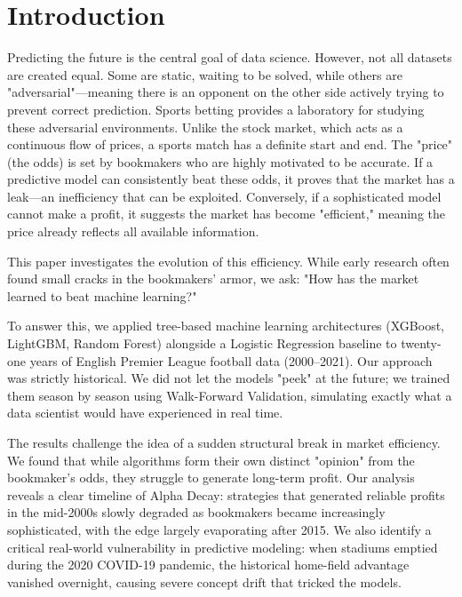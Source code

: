 \documentclass[pdflatex,sn-basic]{sn-jnl}
\begin{document}

\maketitle
\section{Introduction}

Predicting the future is the central goal of data science. However, not all datasets are created equal. Some are static, waiting to be solved, while others are "adversarial"—meaning there is an opponent on the other side actively trying to prevent correct prediction. Sports betting provides a laboratory for studying these adversarial environments. Unlike the stock market, which acts as a continuous flow of prices, a sports match has a definite start and end. The "price" (the odds) is set by bookmakers who are highly motivated to be accurate. If a predictive model can consistently beat these odds, it proves that the market has a leak—an inefficiency that can be exploited. Conversely, if a sophisticated model cannot make a profit, it suggests the market has become "efficient," meaning the price already reflects all available information.

This paper investigates the evolution of this efficiency. While early research often found small cracks in the bookmakers' armor, we ask: "How has the market learned to beat machine learning?"

To answer this, we applied tree-based machine learning architectures (XGBoost, LightGBM, Random Forest) alongside a Logistic Regression baseline to twenty-one years of English Premier League football data (2000–2021). Our approach was strictly historical. We did not let the models "peek" at the future; we trained them season by season using Walk-Forward Validation, simulating exactly what a data scientist would have experienced in real time.

The results challenge the idea of a sudden structural break in market efficiency. We found that while algorithms form their own distinct "opinion" from the bookmaker's odds, they struggle to generate long-term profit. Our analysis reveals a clear timeline of Alpha Decay: strategies that generated reliable profits in the mid-2000s slowly degraded as bookmakers became increasingly sophisticated, with the edge largely evaporating after 2015. We also identify a critical real-world vulnerability in predictive modeling: when stadiums emptied during the 2020 COVID-19 pandemic, the historical home-field advantage vanished overnight, causing severe concept drift that tricked the models.
\end{document}
